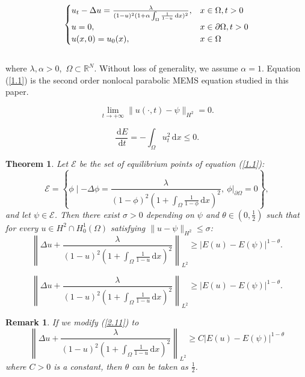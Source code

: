 \documentclass[10pt,a4paper]{amsart}
\newtheorem{theorem}{Theorem}
\newtheorem{remark}{Remark}
\begin{document}
\begin{equation}
    \noindent
    \begin{cases}
        u_{t}-\Delta u=\frac{\lambda}{(1-u)^2(1+\alpha\int_{\Omega}\frac{1}{1-u}\,\mathrm{d}x)^2},&x\in\Omega,t>0\\
        u=0,&x\in\partial\Omega,t>0\\
        u(x,0)=u_0(x),&x\in\Omega
    \end{cases}\label{1.1}
\end{equation}\\
where $\lambda,\alpha>0$,\ $\Omega\subset\mathbb{R}^{N}$. Without loss of generality, we assume $\alpha = 1$. Equation (\ref{1.1}) is the second order nonlocal parabolic MEMS equation studied in this paper.

  \begin{equation}
      \lim_{t \to +\infty} \|u(\cdot,t)-\psi\|_{H^2}=0. \label{1.6}
  \end{equation}

\begin{equation}
  \frac{\,\mathrm{d}E}{\,\mathrm{d}t}=-\int_{\Omega}u_{t}^2\,\mathrm{d}x\le 0.\label{2.2}
\end{equation}

\begin{theorem}\label{theorem2.1}
    Let $\mathscr{E}$ be the set of equilibrium points of equation (\ref{1.1}):
    $$\mathscr{E}=\left\{\phi\mid -\Delta\phi=\frac{\lambda}{(1-\phi)^2(1+\int_{\Omega}\frac{1}{1-\phi}\,\mathrm{d}x)^2},\  \phi|_{\partial\Omega}=0\right\},$$
    and let $\psi\in\mathscr{E}$. Then there exist $\sigma>0$ depending on $\psi$ and $\theta\in (0,\frac{1}{2})$ such that for every $u\in H^2\cap H_0^1(\Omega)$ satisfying $\|u-\psi\|_{H^2}\le\sigma$:
    \begin{equation}
        \left\|\Delta u+\frac{\lambda}{(1-u)^2(1+\int_{\Omega}\frac{1}{1-u}\,\mathrm{d}x)^2}\right\|_{L^2}\ge |E(u)-E(\psi)|^{1-\theta}.\label{2.11}
    \end{equation}
\end{theorem}

    \begin{equation}
        \left\|\Delta u+\frac{\lambda}{(1-u)^2(1+\int_{\Omega}\frac{1}{1-u}\,\mathrm{d}x)^2}\right\|_{L^2}\ge |E(u)-E(\psi)|^{1-\theta}.
    \end{equation}

\begin{remark}\label{remark2.1}
    If we modify (\ref{2.11}) to
    \begin{equation}
        \left\|\Delta u+\frac{\lambda}{(1-u)^2(1+\int_{\Omega}\frac{1}{1-u}\,\mathrm{d}x)^2}\right\|_{L^{2}}\ge C|E(u)-E(\psi)|^{1-\theta}\label{2.25}
    \end{equation}
    where $C>0$ is a constant, then $\theta$ can be taken as $\frac{1}{2}$.
\end{remark}
\end{document}
